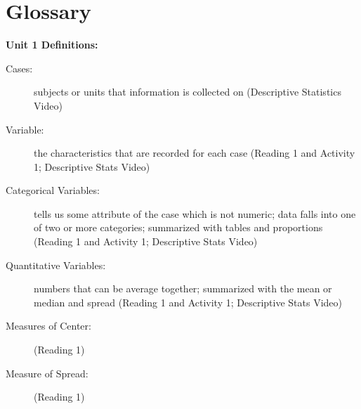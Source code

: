 
\def\theTopic{Glossary }
\def\dayNum{  }

\section{Glossary}

\begin{center}
 {\large\bf  Unit 1 Definitions:}
\end{center}
\begin{description}
\item [Cases:] subjects or units that information is collected on (Descriptive Statistics Video)
\item [Variable:] the characteristics that are recorded for each case
  (Reading 1 and Activity 1; Descriptive Stats Video)
\item [Categorical Variables:] tells us some attribute of the case
  which is not numeric; data falls into one of two or more categories;
  summarized with tables and proportions (Reading 1 and Activity 1;
  Descriptive Stats Video)
\item [Quantitative Variables:] numbers that can be average together;
  summarized with the mean or median and spread (Reading 1 and
  Activity 1; Descriptive Stats Video)
\item [Measures of Center:]  (Reading 1)

\item [Measure of Spread:] (Reading 1)


\end{description}
